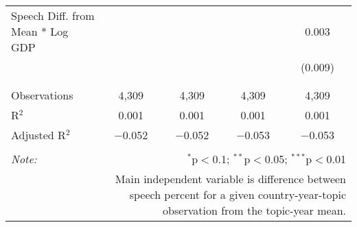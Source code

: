 \begin{table}[!htbp]
\begin{tabular}{@{\extracolsep{5pt}}lcccc}
 Speech Diff. from Mean * Log GDP &  &  &  & 0.003 \\ 
  &  &  &  & (0.009) \\ 
  & & & & \\ 
\hline \\[-1.8ex] 
Observations & 4,309 & 4,309 & 4,309 & 4,309 \\ 
R$^{2}$ & 0.001 & 0.001 & 0.001 & 0.001 \\ 
Adjusted R$^{2}$ & $-$0.052 & $-$0.052 & $-$0.053 & $-$0.053 \\ 
\hline 
\hline \\[-1.8ex] 
\textit{Note:}  & \multicolumn{4}{r}{$^{*}$p$<$0.1; $^{**}$p$<$0.05; $^{***}$p$<$0.01} \\ 
 & \multicolumn{4}{r}{Main independent variable is difference between speech percent for a given country-year-topic observation from the topic-year mean.} \\ 
\end{tabular} 
\end{table} 
